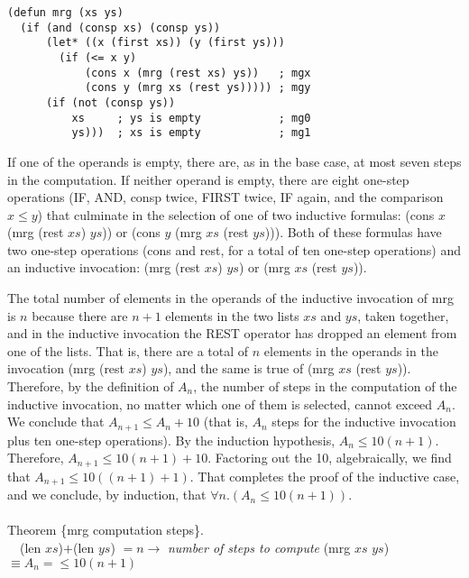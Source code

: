 \label{defun:mrg-copy}
\begin{Verbatim}
(defun mrg (xs ys)
  (if (and (consp xs) (consp ys))
      (let* ((x (first xs)) (y (first ys)))
        (if (<= x y)
            (cons x (mrg (rest xs) ys))   ; mgx
            (cons y (mrg xs (rest ys))))) ; mgy
      (if (not (consp ys))
          xs     ; ys is empty            ; mg0
          ys)))  ; xs is empty            ; mg1
\end{Verbatim}

If one of the operands is empty, there are, as in the base case,
at most seven steps in the computation.
If neither operand is empty, there are eight one-step operations
(IF, AND, consp twice, FIRST twice, IF again, and the comparison $x \leq y$)
that culminate in the selection of
one of two inductive formulas: (cons $x$ (mrg (rest $xs$) $ys$))
or (cons $y$ (mrg $xs$ (rest $ys$))).
Both of these formulas have two one-step operations (cons and rest,
for a total of ten one-step operations)
and an inductive invocation:
(mrg (rest $xs$) $ys$) or (mrg $xs$ (rest $ys$)).

The total number of elements in the operands of the inductive invocation of mrg
is $n$ because there are $n+1$ elements in the two lists $xs$ and $ys$,
taken together, and in the inductive invocation the REST operator has
dropped an element from one of the lists.
That is, there are a total of $n$ elements in the operands
in the invocation (mrg (rest $xs$) $ys$),
and the same is true of (mrg $xs$ (rest $ys$)).
Therefore, by the definition of $A_n$,
the number of steps in the computation of the inductive invocation,
no matter which one of them is selected, cannot exceed $A_n$.
We conclude that $A_{n+1} \leq A_n + 10$
(that is, $A_n$ steps for the inductive invocation
plus ten one-step operations).
By the induction hypothesis, $A_n \leq 10(n+1)$.
Therefore, $A_{n+1} \leq 10(n+1) + 10$.
Factoring out the 10, algebraically,
we find that $A_{n+1} \leq 10((n+1) + 1)$.
That completes the proof of the inductive case,
and we conclude, by induction, that $\forall n.(A_n \leq 10(n+1))$.\\
\\
\label{thm:mrg-computation-time}
\label{thm:mrg-steps}
Theorem \{mrg computation steps\}. \\
~~(len $xs$)$+$(len $ys$) $= n \rightarrow$ \emph{number of steps to compute} (mrg $xs$ $ys$) $\equiv A_n = \leq 10(n+1)$

